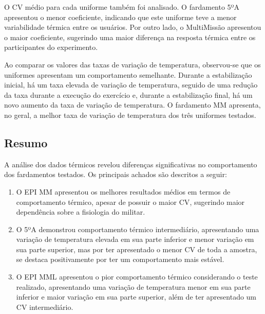             O \acrlong{CV} médio para cada uniforme também foi analisado. O fardamento 5ºA apresentou 
            o menor coeficiente, indicando que este uniforme teve a menor variabilidade térmica entre 
            os usuários. Por outro lado, o MultiMissão apresentou o maior coeficiente, sugerindo uma 
            maior diferença na resposta térmica entre os participantes do experimento.

        Ao comparar os valores das taxas de variação de temperatura, observou-se que os 
        uniformes apresentam um comportamento semelhante. Durante a estabilização inicial, há um 
        taxa elevada de variação de temperatura, seguido de uma redução da taxa durante a execução do exercício 
        e, durante a estabilização final, há um novo aumento da taxa de variação de temperatura. 
        O fardamento \acrshort{MM} apresenta, no geral, a melhor taxa de variação de temperatura 
        dos três uniformes testados.

    \subsection{Resumo}
        A análise dos dados térmicos revelou diferenças significativas no comportamento dos 
        fardamentos testados. Os principais achados são descritos a seguir:
        
        \begin{enumerate}[label=\Roman*.] %
            \item O \acrshort{EPI} \acrlong{MM} apresentou os melhores resultados médios em termos de 
            comportamento térmico, apesar de possuir o maior \acrlong{CV}, sugerindo maior dependência 
            sobre a fisiologia do militar.
            \item O 5ºA demonstrou comportamento térmico intermediário, apresentando uma variação de 
            temperatura elevada em sua parte inferior e menor variação em sua parte superior, mas por 
            ter apresentado o menor \acrlong{CV} de toda a amostra, se destaca positivamente por ter 
            um comportamento mais estável.
            \item O \acrshort{EPI} \acrlong{MML} apresentou o pior comportamento térmico considerando o 
            teste realizado, apresentando uma variação de temperatura menor em 
            sua parte inferior e maior variação em sua parte superior, além de 
            ter apresentado um \acrlong{CV} intermediário.
            \end{enumerate}   
        
